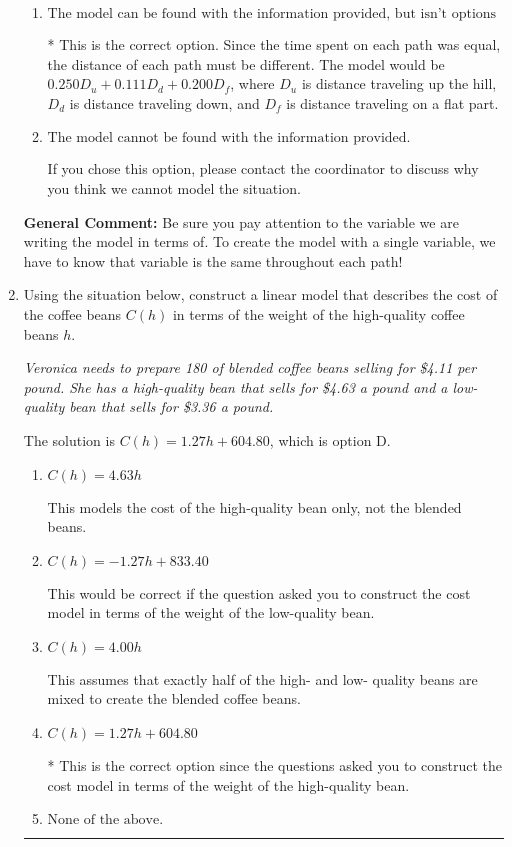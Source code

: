 \documentclass{extbook}[14pt]
\newcommand{\litem}[1]{\item #1

\rule{\textwidth}{0.4pt}}
\begin{document}
\begin{enumerate}
{\begin{enumerate}[label=\Alph*.]
This would be correct if we knew all parts of the path are equal length.
\item \( \text{The model can be found with the information provided, but isn't options 1-3.} \)

* This is the correct option. Since the time spent on each path was equal, the distance of each path must be different. The model would be $0.250D_u + 0.111D_d + 0.200D_f$, where $D_u$ is distance traveling up the hill, $D_d$ is distance traveling down, and $D_f$ is distance traveling on a flat part.
\item \( \text{The model cannot be found with the information provided.} \)

If you chose this option, please contact the coordinator to discuss why you think we cannot model the situation.
\end{enumerate}

\textbf{General Comment:} Be sure you pay attention to the variable we are writing the model in terms of. To create the model with a single variable, we have to know that variable is the same throughout each path!
}
\litem{
Using the situation below, construct a linear model that describes the cost of the coffee beans $C(h)$ in terms of the weight of the high-quality coffee beans $h$.

\begin{center}
    \textit{ Veronica needs to prepare 180 of blended coffee beans selling for \$4.11 per pound. She has a high-quality bean that sells for \$4.63 a pound and a low-quality bean that sells for \$3.36 a pound. }
\end{center}
The solution is \( C(h) = 1.27 h + 604.80 \), which is option D.\begin{enumerate}[label=\Alph*.]
\item \( C(h) = 4.63 h \)

This models the cost of the high-quality bean only, not the blended beans.
\item \( C(h) = -1.27 h + 833.40 \)

This would be correct if the question asked you to construct the cost model in terms of the weight of the low-quality bean.
\item \( C(h) = 4.00 h \)

This assumes that exactly half of the high- and low- quality beans are mixed to create the blended coffee beans.
\item \( C(h) = 1.27 h + 604.80 \)

* This is the correct option since the questions asked you to construct the cost model in terms of the weight of the high-quality bean.
\item \( \text{None of the above.} \)


\end{enumerate}}
\end{enumerate}
\end{document}
